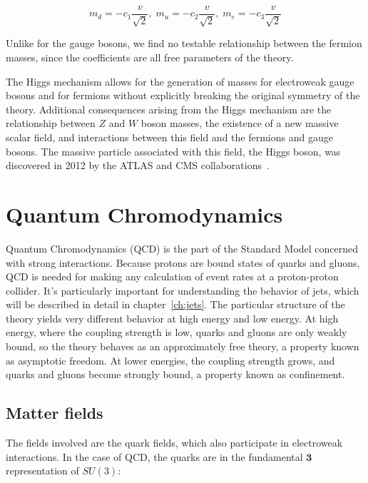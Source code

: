 \begin{equation}\label{ew:fermion_masses}
    m_d = -c_1\frac{v}{\sqrt{2}},\; m_u = -c_2\frac{v}{\sqrt{2}},\; m_e = -c_3\frac{v}{\sqrt{2}}
\end{equation}

Unlike for the gauge bosons, we find no testable relationship between the fermion masses,
since the coefficients are all free parameters of the theory.

The Higgs mechanism allows for the generation of masses for electroweak gauge bosons and for fermions without explicitly
breaking the original symmetry of the theory.
Additional consequences arising from the Higgs mechanism are the relationship between $Z$ and $W$ boson masses,
the existence of a new massive scalar field, and interactions between this field and the fermions and gauge bosons.
The massive particle associated with this field, the Higgs boson, was discovered in 2012 by the ATLAS and CMS collaborations~\cite{sm-higgs-discovery-atlas, sm-higgs-discovery-cms}.

\section{Quantum Chromodynamics}\label{sec:sm_qcd}

Quantum Chromodynamics (QCD) is the part of the Standard Model concerned with strong interactions.
Because protons are bound states of quarks and gluons,
QCD is needed for making any calculation of event rates at a proton-proton collider.
It's particularly important for understanding the behavior of jets, which will be described in detail in chapter~\ref{ch:jets}.
The particular structure of the theory yields very different behavior at high energy and low energy.
At high energy, where the coupling strength is low, quarks and gluons are only weakly bound,
so the theory behaves as an approximately free theory, a property known as asymptotic freedom.
At lower energies, the coupling strength grows, and quarks and gluons become strongly bound,
a property known as confinement.

\subsection{Matter fields}\label{subsec:matter fields}

The fields involved are the quark fields, which also participate in electroweak interactions.
In the case of QCD, the quarks are in the fundamental $\boldsymbol{3}$ representation of $SU(3)$:

